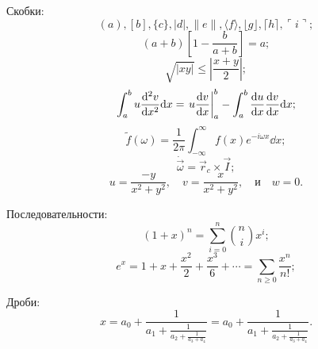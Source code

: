\documentclass[a4paper, 14pt]{extreport}
\begin{document}
Скобки:
\begin{equation}
    ( a ), [ b ], \{ c \}, | d |, \| e \|, \langle f \rangle, \lfloor g \rfloor, \lceil h \rceil, \ulcorner i \urcorner;
\end{equation}
\begin{equation}
    \left( a + b \right) \left[ 1 - \frac{b}{a+b} \right] = a;
\end{equation}
\begin{equation}
    \sqrt{|xy|} \leq \left| \frac{x + y}{2} \right|;
\end{equation}
\begin{equation}
    \int_a^b u \dv[2]{v}{x} \dd x = \left. u \dv{v}{x} \right|_a^b -\int_a^b \dv{u}{x} \dv{v}{x} \dd x;
\end{equation}
\begin{equation}
    \tilde f(\omega) = \frac{1}{2\pi} \int_{-\infty}^\infty f(x)e^{-i\omega x} \dd x;
\end{equation}
\begin{equation}
    \dot{\vec \omega} = \vec r_c \times \vec I;
\end{equation}
\begin{equation}
    u = \frac{-y}{x^2 + y^2}, \quad v = \frac{x}{x^2 + y^2}, \quad \text{и} \quad w = 0.
\end{equation}

Последовательности:
\begin{equation}
    (1+x)^n = \sum_{i=0}^n \binom{n}{i} x^i;
\end{equation}
\begin{equation}
    e^x = 1 + x + \frac{x^2}{2} + \frac{x^3}{6} + \cdots = \sum_{n \ge 0} \frac{x^n}{n!};
\end{equation}

Дроби:
\begin{equation}
    x = 
    a_0 + \frac{1}{a_1 + \frac{1}{a_2 + \frac{1}{a_3 + a_4}}}
    =
    a_0 + \frac{1}{\displaystyle a_1
        + \frac{1}{\displaystyle a_2
        + \frac{1}{\displaystyle a_3 + a_4}}}.
\end{equation}
\end{document}
